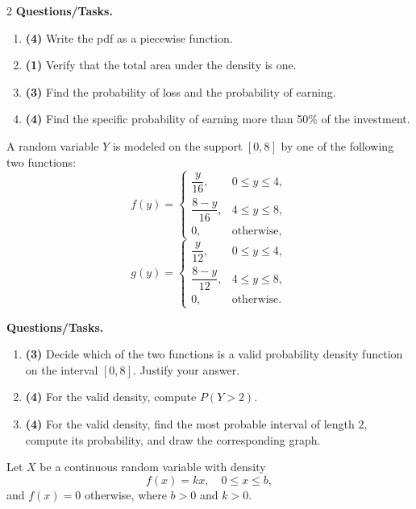 \begin{multicols}{2}
		\textbf{Questions/Tasks.}
		\begin{enumerate}[label=\textbf{\alph*)}]
			\item \textbf{(4)} Write the pdf as a piecewise function.
			\item \textbf{(1)} Verify that the total area under the density is one.
			\item \textbf{(3)} Find the probability of loss and the probability of earning.
			\item \textbf{(4)} Find the specific probability of earning more than 50\% of the investment.
		\end{enumerate}
		
		\vspace{0.25cm}
		\vspace{-0.3cm}
		A random variable $Y$ is modeled on the support $[0,8]$ by one of the following two functions:
		\[
		f(y)=\begin{cases}
			\dfrac{y}{16}, & 0\le y\le 4,\\
			\dfrac{8-y}{16}, & 4\le y\le 8,\\
			0, & \text{otherwise,}
		\end{cases}
		\]
		\[
		g(y)=\begin{cases}
			\dfrac{y}{12}, & 0\le y\le 4,\\
			\dfrac{8-y}{12}, & 4\le y\le 8,\\
			0, & \text{otherwise.}
		\end{cases}
		\]
		
		\textbf{Questions/Tasks.}
		\begin{enumerate}[label=(\alph*)]
			\item \textbf{(3)} Decide which of the two functions is a valid probability density function on the interval $[0,8]$. Justify your answer.
			\item \textbf{(4)} For the valid density, compute $P(Y>2)$.
			\item \textbf{(4)} For the valid density, find the most probable interval of length $2$, compute its probability, and draw the corresponding graph.
		\end{enumerate}
		
		\vspace{0.25cm}
		\vspace{-0.3cm}
		Let $X$ be a continuous random variable with density
		\[
		f(x)=kx,\quad 0\le x\le b,
		\]
		and $f(x)=0$ otherwise, where $b>0$ and $k>0$.
		

\end{multicols}
